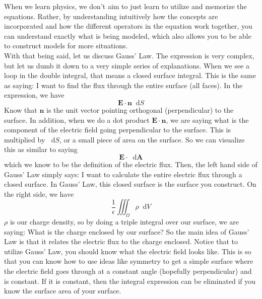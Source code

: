 \documentclass{article}
\newcommand*\VF[1]{\mathbf{#1}}
\newcommand*\dif{\mathop{}\!\mathrm{d}}
\begin{document}
When we learn physics, we don't aim to just learn to utilize and memorize the equations. Rather, by understanding intuitively how the concepts are incorporated and how the different operators in the equation work together, you can understand exactly what is being modeled, which also allows you to be able to construct models for more situations.\\
With that being said, let us discuss Gauss' Law. The expression is very complex, but let us dumb it down to a very simple series of explanations. When we see a loop in the double integral, that means a closed surface integral. This is the same as saying: I want to find the flux through the entire surface (all faces). In the expression, we have $$\VF{E} \cdot \VF{n} \dif S$$Know that $\VF{n}$ is the unit vector pointing orthogonal (perpendicular) to the surface. In addition, when we do a dot product $\VF{E} \cdot \VF{n}$, we are saying what is the component of the electric field going perpendicular to the surface. This is multiplied by $\dif S$, or a small piece of area on the surface. So we can visualize this as similar to saying $$\VF{E} \cdot \dif \VF{A}$$which we know to be the definition of the electric flux. Then, the left hand side of Gauss' Law simply says: I want to calculate the entire electric flux through a closed surface. In Gauss' Law, this closed surface is the surface you construct. On the right side, we have $$\frac{1}{\epsilon}\iiint_{\Omega} \rho \dif V$$$\rho$ is our charge density, so by doing a triple integral over our surface, we are saying: What is the charge enclosed by our surface? So the main idea of Gauss' Law is that it relates the electric flux to the charge enclosed. Notice that to utilize Gauss' Law, you should know what the electric field looks like. This is so that you can know how to use ideas like symmetry to get a simple surface where the electric field goes through at a constant angle (hopefully perpendicular) and is constant. If it is constant, then the integral expression can be eliminated if you know the surface area of your surface. \\
\\
\end{document}
